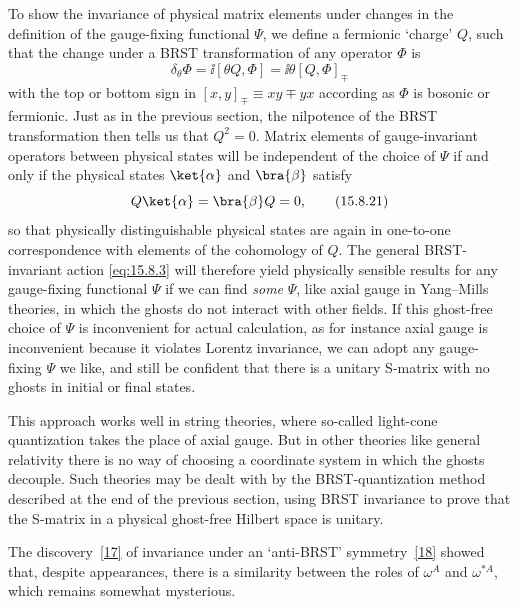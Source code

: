 To show the invariance of physical matrix elements under changes in the definition of the gauge-fixing functional $\Psi$, we define a fermionic `charge' $Q$, such that the change under a BRST transformation of any operator $\Phi$ is
\begin{equation}
 \delta_\theta\Phi=\ii[\theta Q,\Phi]=\ii\theta[Q,\Phi]_{\mp}
 \tag{15.8.20}\label{eq:15.8.20}
\end{equation}
with the top or bottom sign in $[x,y]_{\mp}\equiv xy\mp yx$ according as $\Phi$ is bosonic or fermionic. Just as in the previous section, the nilpotence of the BRST transformation then tells us that $Q^2=0$. Matrix elements of gauge-invariant operators between physical states will be independent of the choice of $\Psi$ if and only if the physical states $\ket{\alpha}$ and $\bra{\beta}$ satisfy
\begin{equation}
 Q\ket{\alpha}=\bra{\beta}Q=0,
 \tag{15.8.21}\label{eq:15.8.21}
\end{equation}
so that physically distinguishable physical states are again in one-to-one correspondence with elements of the cohomology of $Q$. The general BRST-invariant action \eqref{eq:15.8.3} will therefore yield physically sensible results for any gauge-fixing functional $\Psi$ if we can find \emph{some} $\Psi$, like axial gauge in Yang--Mills theories, in which the ghosts do not interact with other fields. If this ghost-free choice of $\Psi$ is inconvenient for actual calculation, as for instance axial gauge is inconvenient because it violates Lorentz invariance, we can adopt any gauge-fixing $\Psi$ we like, and still be confident that there is a unitary S-matrix with no ghosts in initial or final states.

This approach works well in string theories, where so-called light-cone quantization takes the place of axial gauge. But in other theories like general relativity there is no way of choosing a coordinate system in which the ghosts decouple. Such theories may be dealt with by the BRST-quantization method described at the end of the previous section, using BRST invariance to prove that the S-matrix in a physical ghost-free Hilbert space is unitary.

The discovery~\hyperref[ch15-ref-17]{[17]} of invariance under an `anti-BRST' symmetry~\hyperref[ch15-ref-18]{[18]} showed that, despite appearances, there is a similarity between the roles of $\omega^A$ and $\omega^{*A}$, which remains somewhat mysterious.
